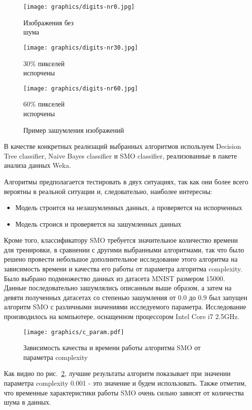 \documentclass{article}
\begin{document}
\begin{figure}[ht!b]
\centering
\begin{minipage}{.3\textwidth}
	\texttt{[image: graphics/digits-nr0.jpg]}
	\captionsetup{justification=centering}
	\caption*{Изображения без\\ шума}
\end{minipage}
\begin{minipage}{.3\textwidth}
	\texttt{[image: graphics/digits-nr30.jpg]}
	\captionsetup{justification=centering}
	\caption*{ 30\% пикселей\\ испорчены}
\end{minipage}
\begin{minipage}{.3\textwidth}
	\texttt{[image: graphics/digits-nr60.jpg]}
	\captionsetup{justification=centering}
	\caption*{ 60\% пикселей\\ испорчены}
\end{minipage}
\caption{Пример зашумления изображений}
\label{fig:noise}
\end{figure}
В качестве конкретных реализаций выбранных алгоритмов используем Decision Tree classifier, Naive Bayes classifier и SMO classifier, реализованные в пакете анализа данных Weka.

Алгоритмы предполагается тестировать в двух ситуациях, так как они более всего вероятны в реальной ситуации и, следовательно, наиболее интересны:
\begin{itemize}
\item Модель строится на незашумленных данных, а проверяется на испорченных
\item Модель строися и проверяется на зашумленных данных
\end{itemize}

Кроме того, классификатору SMO требуется значительное количество времени для тренировки, в сравнении с другими выбранными алгоритмами, так что было решено провести небольшое дополнительное исследование этого алгоритма на зависимость времени и качества его работы от параметра алгоритма complexity. Было выбрано подмножество данных из датасета MNIST размером 15000. Данные последовательно зашумлялись описанным выше образом, а затем на девяти полученных датасетах со степенью зашумления от 0.0 до 0.9 был запущен алгоритм SMO с различными значениями исследуемого параметра. Исследование производилось на компьютере, оснащенном процессором Intel Core i7 2.5GHz.
\begin{figure}[ht]
\texttt{[image: graphics/c\_param.pdf]}
\captionsetup{justification=centering}
\caption{Зависимость качества и времени работы алгоритма SMO от параметра complexity}
\label{fig:SMO_qual}
\end{figure}
Как видно по рис.~\ref{fig:SMO_qual}, лучшие результаты алгоритм показывает при значении параметра complexity 0.001 - это значение и будем использовать. Также отметим, что временные характеристики работы SMO очень сильно зависят от количества шума в данных.
\end{document}
